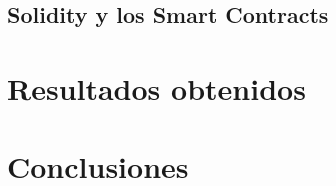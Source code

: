 \documentclass[a4paper,10pt]{article}
\begin{document}
	\subsection{Solidity y los Smart Contracts}
	
	\section{Resultados obtenidos}
	\section{Conclusiones}
	\nocite{*}
	\printbibliography[heading=bibintoc]
\end{document}
